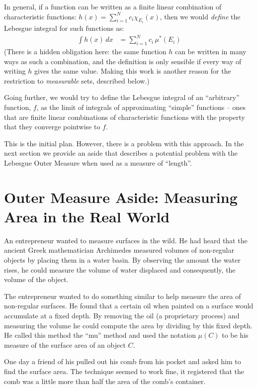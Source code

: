 \documentclass{article}
\begin{document}
In general, if a function can be written as a finite linear combination of
characteristic functions: $h(x) = \sum_{i=1}^N c_i \chi_{E_i}(x)$,
then we would {\em define\/} the Lebesgue integral for such functions as:
\begin{align*}
	\int h(x) \, dx &= \sum_{i=1}^N c_i \, \mu^*(E_i)
\end{align*}
(There is a hidden obligation here: the same function $h$ can be written in
many ways as such a combination, and the definition is only sensible if
every way of writing $h$ gives the same value.  Making this work is another
reason for the restriction to {\em measurable\/} sets, described below.)

Going further, we would try to define the Lebesgue integral of an ``arbitrary''
function, $f$, as the limit of integrals of approximating ``simple''
functions -- ones that are finite linear combinations of characteristic
functions with the property that they converge pointwise to $f$.

This is the initial plan. However, there is a problem with this approach. 
In the next section we provide an aside that describes a potential problem 
with the Lebesgue Outer Measure when used as a measure of ``length''.

\section{Outer Measure Aside: Measuring Area in the Real World}
An entrepreneur 
wanted to measure surfaces in the wild. He had heard that the 
ancient Greek mathematician Archimedes measured volumes of non-regular objects 
by placing them in a water basin. By observing the amount the water rises, he 
could measure the volume of water displaced and consequently, the volume of the object.

The entrepreneur wanted to do something similar to help measure the area of 
non-regular surfaces. He found that a 
certain oil when painted on a surface would accumulate at a fixed depth. By 
removing the oil (a proprietary process) and measuring the volume he could 
compute the area by dividing by this fixed depth. He called this method the
``mu'' method and used the notation $\mu(C)$ to be his measure of the surface
area of an object $C$.

One day a friend of his pulled out his comb from his pocket and asked him to 
find the surface area. The technique seemed to work fine, it registered that 
the comb was a little more than half the area of the comb's container.
\end{document}
